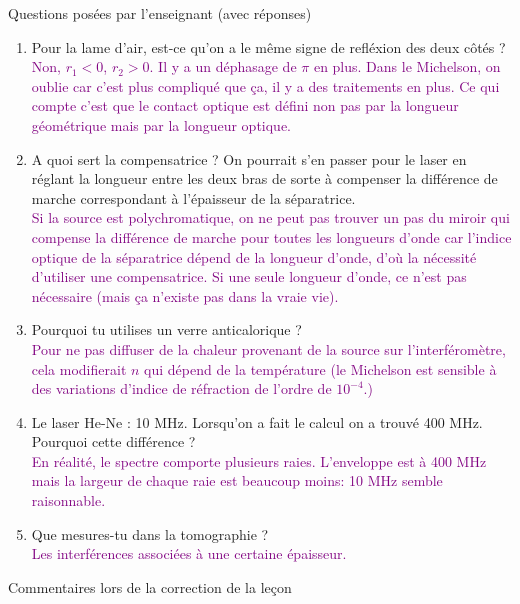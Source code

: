 \begin{reportBlock}{Questions posées par l’enseignant (avec réponses)}
\begin{enumerate}
    \item Pour la lame d'air, est-ce qu'on a le même signe de refléxion des deux côtés ? \\
       \textcolor{purple}{Non, $r_1 < 0$, $r_2 > 0$. Il y a un déphasage de $\pi$ en plus. Dans le Michelson, on oublie car c'est plus compliqué que ça, il y a des traitements en plus. Ce qui compte c'est que le contact optique est défini non pas par la longueur géométrique mais par la longueur optique.}
    
    \item A quoi sert la compensatrice ? On pourrait s'en passer pour le laser en réglant la longueur entre les deux bras de sorte à compenser la différence de marche correspondant à l'épaisseur de la séparatrice. \\
       \textcolor{purple}{Si la source est polychromatique, on ne peut pas trouver un pas du miroir qui compense la différence de marche pour toutes les longueurs d'onde car l'indice optique de la séparatrice dépend de la longueur d'onde, d'où la nécessité d'utiliser une compensatrice. Si une seule longueur d'onde, ce n'est pas nécessaire (mais ça n'existe pas dans la vraie vie).}
    
    \item Pourquoi tu utilises un verre anticalorique ? \\
    \textcolor{purple}{Pour ne pas diffuser de la chaleur provenant de la source sur l'interféromètre, cela modifierait $n$ qui dépend de la température (le Michelson est sensible à des variations d'indice de réfraction de l'ordre de $10^{-4}$.)}
       
    \item Le laser He-Ne : 10 MHz. Lorsqu'on a fait le calcul on a trouvé 400 MHz. Pourquoi cette différence ? \\
       \textcolor{purple}{En réalité, le spectre comporte plusieurs raies. L'enveloppe est à 400 MHz mais la largeur de chaque raie est beaucoup moins: 10 MHz semble raisonnable.}

       
    \item Que mesures-tu dans la tomographie ? \\
       \textcolor{purple}{Les interférences associées à une certaine épaisseur.}
      
  \end{enumerate}
\end{reportBlock}


\begin{reportBlock}{Commentaires lors de la correction de la leçon}
\end{reportBlock}


